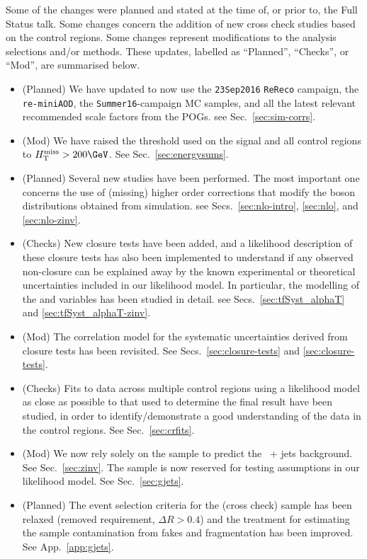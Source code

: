 Some of the changes were planned and stated at the time of, or prior
to, the Full Status talk. Some changes concern the addition of new
cross check studies based on the control regions. Some changes
represent modifications to the analysis selections and/or
methods. These updates, labelled as ``Planned'', ``Checks'', or
``Mod'', are summarised below.
  
\begin{itemize}
  
\item (Planned) We have updated to now use the \verb!23Sep2016!
  \verb!ReReco! campaign, the \verb!re-miniAOD!, the
  \verb!Summer16!-campaign MC samples, and all the latest relevant
  recommended scale factors from the POGs. \eg see
  Sec.~\ref{sec:sim-corrs}.
  
\item (Mod) We have raised the \HTmiss threshold used on the signal
  and all control regions to $\HTmiss > 200\GeV$. See
  Sec.~\ref{sec:energysums}. 
    
\item (Planned) Several new studies have been performed. The most
  important one concerns the use of (missing) higher order corrections
  that modify the boson \Pt distributions obtained from
  simulation. \eg see Secs.~\ref{sec:nlo-intro}, \ref{sec:nlo}, and
  \ref{sec:nlo-zinv}.

\item (Checks) New closure tests have been added, and a likelihood
  description of these closure tests has also been implemented to
  understand if any observed non-closure can be explained away by the
  known experimental or theoretical uncertainties included in our
  likelihood model. In particular, the modelling of the \alphat and
  \bdphi variables has been studied in detail. \eg see
  Secs.~\ref{sec:tfSyst_alphaT} and \ref{sec:tfSyst_alphaT-zinv}.

\item (Mod) The correlation model for the systematic uncertainties
  derived from closure tests has been revisited. See
  Secs.~\ref{sec:closure-tests} and \ref{sec:closure-tests}.

\item (Checks) Fits to data across multiple control regions using a
  likelihood model as close as possible to that used to determine the
  final result have been studied, in order to identify/demonstrate a
  good understanding of the data in the control regions. See
  Sec.~\ref{sec:crfits}.

\item (Mod) We now rely solely on the \mmj sample to predict the
  \znunu\ + jets background. See Sec.~\ref{sec:zinv}. The \gj sample
  is now reserved for testing assumptions in our likelihood model. See
  Sec.~\ref{sec:gjets}.

\item (Planned) The event selection criteria for the \gj (cross check)
  sample has been relaxed (removed \alphat requirement, $\Delta R >
  0.4$) and the treatment for estimating the sample contamination from
  fakes and fragmentation has been improved. See App.~\ref{app:gjets}.

\end{itemize}

